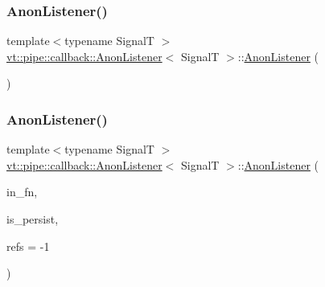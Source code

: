 \subsubsection{\texorpdfstring{Anon\+Listener()}{AnonListener()}\hspace{0.1cm}{\footnotesize\ttfamily [3/5]}}
{\footnotesize\ttfamily template$<$typename SignalT $>$ \\
\hyperlink{structvt_1_1pipe_1_1callback_1_1_anon_listener}{vt\+::pipe\+::callback\+::\+Anon\+Listener}$<$ SignalT $>$\+::\hyperlink{structvt_1_1pipe_1_1callback_1_1_anon_listener}{Anon\+Listener} (\begin{DoxyParamCaption}\item[{\hyperlink{structvt_1_1pipe_1_1callback_1_1_anon_listener}{Anon\+Listener}$<$ SignalT $>$ \&\&}]{ }\end{DoxyParamCaption})\hspace{0.3cm}{\ttfamily [default]}}

\mbox{\label{structvt_1_1pipe_1_1callback_1_1_anon_listener_afaa19c0b06e657dc701b60ebc9427b0d}} 
\subsubsection{\texorpdfstring{Anon\+Listener()}{AnonListener()}\hspace{0.1cm}{\footnotesize\ttfamily [4/5]}}
{\footnotesize\ttfamily template$<$typename SignalT $>$ \\
\hyperlink{structvt_1_1pipe_1_1callback_1_1_anon_listener}{vt\+::pipe\+::callback\+::\+Anon\+Listener}$<$ SignalT $>$\+::\hyperlink{structvt_1_1pipe_1_1callback_1_1_anon_listener}{Anon\+Listener} (\begin{DoxyParamCaption}\item[{\hyperlink{structvt_1_1pipe_1_1callback_1_1_anon_listener_ad5d8a2cc6a1599642855e92bbd10f89c}{Callback\+Fn\+Type} const \&}]{in\+\_\+fn,  }\item[{bool}]{is\+\_\+persist,  }\item[{\hyperlink{namespacevt_a9b39ce9494bb04674d0d5b895a5aa50f}{Ref\+Type}}]{refs = {\ttfamily -\/1} }\end{DoxyParamCaption})}

